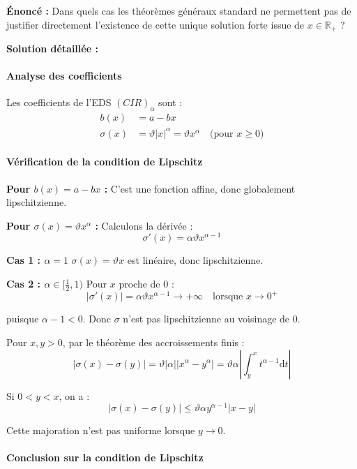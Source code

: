 \documentclass[12pt,a4paper]{article}
\theoremstyle{definition}
\theoremstyle{remark}
\newcommand{\R}{\mathbb{R}}
\newcommand{\dd}{\mathrm{d}}
\begin{document}
\textbf{Énoncé :} Dans quels cas les théorèmes généraux standard ne permettent pas de justifier directement l'existence de cette unique solution forte issue de $x \in \R_+$ ?

\textbf{Solution détaillée :}

\paragraph{Analyse des coefficients}

Les coefficients de l'EDS $(CIR)_\alpha$ sont :
\begin{align*}
b(x) &= a - bx \\
\sigma(x) &= \vartheta|x|^\alpha = \vartheta x^\alpha \quad \text{(pour } x \geq 0\text{)}
\end{align*}

\paragraph{Vérification de la condition de Lipschitz}

\textbf{Pour $b(x) = a - bx$ :} C'est une fonction affine, donc globalement lipschitzienne.

\textbf{Pour $\sigma(x) = \vartheta x^\alpha$ :} Calculons la dérivée :
\[
\sigma'(x) = \alpha \vartheta x^{\alpha-1}
\]

\textbf{Cas 1 : $\alpha = 1$}
$\sigma(x) = \vartheta x$ est linéaire, donc lipschitzienne.

\textbf{Cas 2 : $\alpha \in [\frac{1}{2}, 1)$}
Pour $x$ proche de $0$ :
\[
|\sigma'(x)| = \alpha \vartheta x^{\alpha-1} \to +\infty \quad \text{lorsque } x \to 0^+
\]

puisque $\alpha - 1 < 0$. Donc $\sigma$ n'est pas lipschitzienne au voisinage de $0$.

Pour $x, y > 0$, par le théorème des accroissements finis :
\[
|\sigma(x) - \sigma(y)| = \vartheta|\alpha||x^\alpha - y^\alpha| = \vartheta\alpha\left|\int_y^x t^{\alpha-1}\dd t\right|
\]

Si $0 < y < x$, on a :
\[
|\sigma(x) - \sigma(y)| \leq \vartheta\alpha y^{\alpha-1}|x-y|
\]

Cette majoration n'est pas uniforme lorsque $y \to 0$.

\paragraph{Conclusion sur la condition de Lipschitz}
\end{document}
